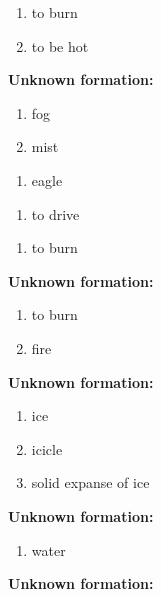 \begin{enumerate}
\item to burn
\item to be hot
\end{enumerate}
\noindent\textbf{Unknown formation:}\\

\begin{enumerate}
\item fog
\item mist
\end{enumerate}
\begin{enumerate}
\item eagle
\end{enumerate}
\begin{enumerate}
\item to drive
\end{enumerate}
\begin{enumerate}
\item to burn
\end{enumerate}
\noindent\textbf{Unknown formation:}\\

\begin{enumerate}
\item to burn
\item fire
\end{enumerate}
\noindent\textbf{Unknown formation:}\\

\begin{enumerate}
\item ice
\item icicle
\item solid expanse of ice
\end{enumerate}
\noindent\textbf{Unknown formation:}\\

\begin{enumerate}
\item water
\end{enumerate}
\noindent\textbf{Unknown formation:}\\

